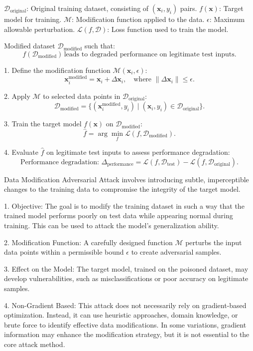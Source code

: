$\mathcal{D}_{\text{original}}$: Original training dataset, consisting of $(\mathbf{x}_i, y_i)$ pairs.  
$f(\mathbf{x})$: Target model for training.  
$\mathcal{M}$: Modification function applied to the data.  
$\epsilon$: Maximum allowable perturbation.  
$\mathcal{L}(f, \mathcal{D})$: Loss function used to train the model.

Modified dataset $\mathcal{D}_{\text{modified}}$ such that:  
\[
f(\mathcal{D}_{\text{modified}}) \, \text{leads to degraded performance on legitimate test inputs}.
\]

1. Define the modification function $\mathcal{M}(\mathbf{x}_i, \epsilon)$:
   \[
   \mathbf{x}_i^{\text{modified}} = \mathbf{x}_i + \Delta \mathbf{x}_i, \quad \text{where } \|\Delta \mathbf{x}_i\| \leq \epsilon.
   \]

2. Apply $\mathcal{M}$ to selected data points in $\mathcal{D}_{\text{original}}$:
   \[
   \mathcal{D}_{\text{modified}} = \{(\mathbf{x}_i^{\text{modified}}, y_i) \mid (\mathbf{x}_i, y_i) \in \mathcal{D}_{\text{original}}\}.
   \]

3. Train the target model $f(\mathbf{x})$ on $\mathcal{D}_{\text{modified}}$:
   \[
   \hat{f} = \arg \min_f \mathcal{L}(f, \mathcal{D}_{\text{modified}}).
   \]

4. Evaluate $\hat{f}$ on legitimate test inputs to assess performance degradation:
   \[
   \text{Performance degradation: } \Delta_{\text{performance}} = \mathcal{L}(f, \mathcal{D}_{\text{test}}) - \mathcal{L}(f, \mathcal{D}_{\text{original}}).
   \]

Data Modification Adversarial Attack involves introducing subtle, imperceptible changes to the training data to compromise the integrity of the target model. 

1. Objective: The goal is to modify the training dataset in such a way that the trained model performs poorly on test data while appearing normal during training. This can be used to attack the model's generalization ability.

2. Modification Function: A carefully designed function $\mathcal{M}$ perturbs the input data points within a permissible bound $\epsilon$ to create adversarial samples.

3. Effect on the Model: The target model, trained on the poisoned dataset, may develop vulnerabilities, such as misclassifications or poor accuracy on legitimate samples.

4. Non-Gradient Based: This attack does not necessarily rely on gradient-based optimization. Instead, it can use heuristic approaches, domain knowledge, or brute force to identify effective data modifications. In some variations, gradient information may enhance the modification strategy, but it is not essential to the core attack method.
